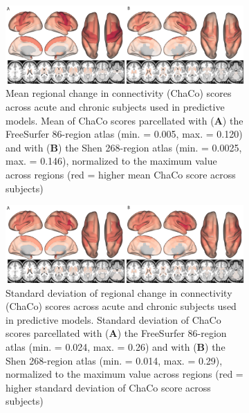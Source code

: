 \documentclass[10pt]{article}
\begin{document}
\begin{figure}
\begin{subfigure}{1\textwidth}
  \includegraphics[width=1\linewidth]{figures/mean_chaco.png}
  \caption{Mean regional change in connectivity (ChaCo) scores across acute and chronic subjects used in predictive models. Mean of ChaCo scores parcellated with (\textbf{A}) the FreeSurfer 86-region atlas (min. = 0.005, max. = 0.120) and with (\textbf{B}) the Shen 268-region atlas (min. = 0.0025, max. = 0.146), normalized to the maximum value across regions (red = higher mean ChaCo score across subjects)}
  \label{fig:sfig1}
\end{subfigure}
\begin{subfigure}{1\textwidth}
  \includegraphics[width=1\linewidth]{figures/std_chaco.png}
  \caption{Standard deviation of regional change in connectivity (ChaCo) scores across acute and chronic subjects used in predictive models. Standard deviation of ChaCo scores parcellated with (\textbf{A}) the FreeSurfer 86-region atlas   (min. = 0.024, max. = 0.26) and with (\textbf{B}) the Shen 268-region atlas (min. = 0.014, max. = 0.29), normalized to the maximum value across regions (red = higher standard deviation of ChaCo score across subjects)} 
  \label{fig:sfig2}
\end{subfigure}
\caption{}
\label{mean_std_chaco}
\end{figure}
\end{document}
